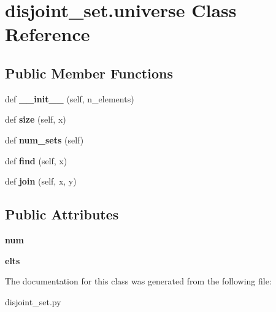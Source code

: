 \hypertarget{classdisjoint__set_1_1universe}{}\section{disjoint\+\_\+set.\+universe Class Reference}
\label{classdisjoint__set_1_1universe}
\subsection*{Public Member Functions}
\begin{DoxyCompactItemize}
\item 
\mbox{\label{classdisjoint__set_1_1universe_ab8b72d19c2817ed1d63d782cba6e59bf}} 
def {\bfseries \+\_\+\+\_\+init\+\_\+\+\_\+} (self, n\+\_\+elements)
\item 
\mbox{\label{classdisjoint__set_1_1universe_accc59298c96e8fd3b021a76acb906476}} 
def {\bfseries size} (self, x)
\item 
\mbox{\label{classdisjoint__set_1_1universe_a9f07308d13409efa89c5a3aea37736ce}} 
def {\bfseries num\+\_\+sets} (self)
\item 
\mbox{\label{classdisjoint__set_1_1universe_ac26e4ba25d4bc99718910aa7a3c75658}} 
def {\bfseries find} (self, x)
\item 
\mbox{\label{classdisjoint__set_1_1universe_afd89c7e8dc93716ff9863b4ce948a19b}} 
def {\bfseries join} (self, x, y)
\end{DoxyCompactItemize}
\subsection*{Public Attributes}
\begin{DoxyCompactItemize}
\item 
\mbox{\label{classdisjoint__set_1_1universe_a5caa5c3a11aae9a5f9d73d8bae1a9ecd}} 
{\bfseries num}
\item 
\mbox{\label{classdisjoint__set_1_1universe_a355c424f1767b625bbf503da1e75f101}} 
{\bfseries elts}
\end{DoxyCompactItemize}


The documentation for this class was generated from the following file\+:\begin{DoxyCompactItemize}
\item 
disjoint\+\_\+set.\+py\end{DoxyCompactItemize}
